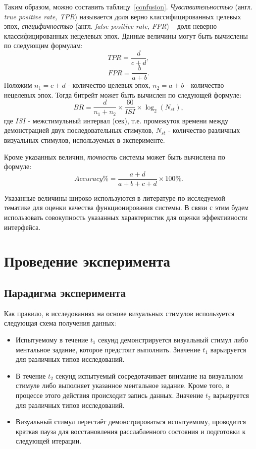 \documentclass[12pt,a4paper,oneside,fleqn,leqno]{article}
\begin{document}
	Таким образом, можно составить таблицу~\ref{confusion}. {\it Чувствительностью} (англ. {\it true positive rate, TPR}) называется доля верно классифицированных целевых эпох, {\it специфичностью} (англ. {\it false positive rate, FPR}) -- доля неверно классифицированных нецелевых эпох. Данные величины могут быть вычислены по следующим формулам:
$$TPR = \frac{d}{c+d},$$
$$FPR = \frac{b}{a+b}.$$
	Положим $n_1 = c+d$ - количество целевых эпох, $n_2 = a+b$ - количество нецелевых эпох. Тогда битрейт может быть вычислен по следующей формуле:
$$BR = \frac{d}{n_1 + n_2} \times \frac{60}{ISI} \times \log_2 (N_{st}),$$
где $ISI$ - межстимульный интервал (сек), т.е. промежуток времени между демонстрацией двух последовательных стимулов, $N_{st}$ - количество различных визуальных стимулов, используемых в эксперименте.
	\par Кроме указанных величин, {\it точность} системы может быть вычислена по формуле:
	$$Accuracy \% = \frac{a+d}{a+b+c+d} \times 100 \%.$$
	\par Указанные величины широко используются в литературе по исследуемой тематике для оценки качества функционирования системы. В связи с этим будем использовать совокупность указанных характеристик для оценки эффективности интерфейса.
\newpage

\section{Проведение эксперимента}
\subsection{Парадигма эксперимента}
	\par Как правило, в исследованиях на основе визуальных стимулов используется следующая схема получения данных:
	\begin{itemize}
	\item
	Испытуемому в течение $t_1$ секунд демонстрируется визуальный стимул либо ментальное задание, которое предстоит выполнить. Значение $t_1$ варьируется для различных типов исследований.
	\item
	В течение $t_2$ секунд испытуемый сосредотачивает внимание на визуальном стимуле либо выполняет указанное ментальное задание. Кроме того, в процессе этого действия происходит запись данных. Значение $t_2$ варьируется для различных типов исследований.
	\item
	Визуальный стимул перестаёт демонстрироваться испытуемому, проводится краткая пауза для восстановления расслабленного состояния и подготовки к следующей итерации.
	\end{itemize}
\end{document}

